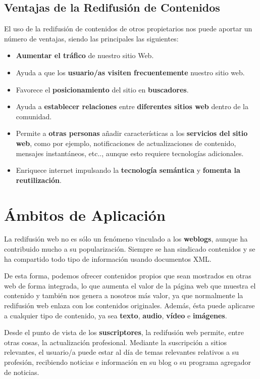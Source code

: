 \subsection{Ventajas de la Redifusión de Contenidos}
El uso de la redifusión de contenidos de otros propietarios nos puede aportar un número de ventajas, siendo las principales las siguientes:

\begin{itemize}
    \item \textbf{Aumentar el tráfico} de nuestro sitio Web.
    \item Ayuda a que los \textbf{usuario/as visiten frecuentemente} nuestro sitio web.
    \item Favorece el \textbf{posicionamiento} del sitio en \textbf{buscadores}.
    \item Ayuda a \textbf{establecer relaciones} entre \textbf{diferentes sitios web} dentro de la comunidad.
    \item Permite a \textbf{otras personas} añadir características a los \textbf{servicios del sitio web}, como por ejemplo, notificaciones de actualizaciones de contenido, mensajes instantáneos, etc.., aunque esto requiere tecnologías adicionales.
    \item Enriquece internet impulsando la \textbf{tecnología semántica} y \textbf{fomenta la reutilización}.
\end{itemize}

\section{Ámbitos de Aplicación}
La redifusión web no es sólo un fenómeno vinculado a los \textbf{weblogs}, aunque ha contribuido mucho a su popularización. Siempre se han sindicado contenidos y se ha compartido todo tipo de información usando documentos XML.

De esta forma, podemos ofrecer contenidos propios que sean mostrados en otras web de forma integrada, lo que aumenta el valor de la página web que muestra el contenido y también nos genera a nosotros más valor, ya que normalmente la redifusión web enlaza con los contenidos originales. Además, ésta puede aplicarse a cualquier tipo de contenido, ya sea \textbf{texto}, \textbf{audio}, \textbf{vídeo} e \textbf{imágenes}.

Desde el punto de vista de los \textbf{suscriptores}, la redifusión web permite, entre otras cosas, la actualización profesional. Mediante la suscripción a sitios relevantes, el usuario/a puede estar al día de temas relevantes relativos a su profesión, recibiendo noticias e información en su blog o su programa agregador de noticias.

